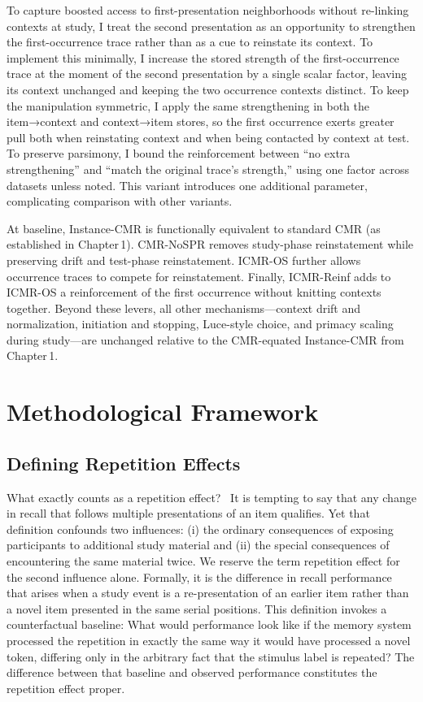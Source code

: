 \documentclass[
  letterpaper,
  11pt,
  english,
  singlespacing,
  headsepline]{MastersDoctoralThesis}
\begin{document}
To capture boosted access to first-presentation neighborhoods without
re-linking contexts at study, I treat the second presentation as an
opportunity to strengthen the first-occurrence trace rather than as a
cue to reinstate its context. To implement this minimally, I increase
the stored strength of the first-occurrence trace at the moment of the
second presentation by a single scalar factor, leaving its context
unchanged and keeping the two occurrence contexts distinct. To keep the
manipulation symmetric, I apply the same strengthening in both the
item→context and context→item stores, so the first occurrence exerts
greater pull both when reinstating context and when being contacted by
context at test. To preserve parsimony, I bound the reinforcement
between ``no extra strengthening'' and ``match the original trace's
strength,'' using one factor across datasets unless noted. This variant
introduces one additional parameter, complicating comparison with other
variants.

At baseline, Instance-CMR is functionally equivalent to standard CMR (as
established in Chapter\,1). CMR-NoSPR removes study-phase reinstatement
while preserving drift and test-phase reinstatement. ICMR-OS further
allows occurrence traces to compete for reinstatement. Finally,
ICMR-Reinf adds to ICMR-OS a reinforcement of the first occurrence
without knitting contexts together. Beyond these levers, all other
mechanisms---context drift and normalization, initiation and stopping,
Luce-style choice, and primacy scaling during study---are unchanged
relative to the CMR-equated Instance-CMR from Chapter\,1.

\section{Methodological Framework}\label{methodological-framework}

\subsection{Defining Repetition
Effects}\label{defining-repetition-effects}

What exactly counts as a repetition effect?~ It is tempting to say that
any change in recall that follows multiple presentations of an item
qualifies. Yet that definition confounds two influences: (i) the
ordinary consequences of exposing participants to additional study
material and (ii) the special consequences of encountering the same
material twice. We reserve the term repetition effect for the second
influence alone. Formally, it is the difference in recall performance
that arises when a study event is a re-presentation of an earlier item
rather than a novel item presented in the same serial positions. This
definition invokes a counterfactual baseline: What would performance
look like if the memory system processed the repetition in exactly the
same way it would have processed a novel token, differing only in the
arbitrary fact that the stimulus label is repeated? The difference
between that baseline and observed performance constitutes the
repetition effect proper.
\end{document}
